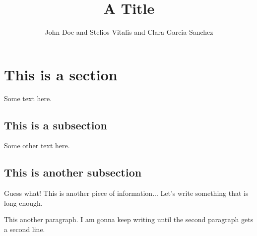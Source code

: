 \documentclass{article}
\title{A Title}
\author{John Doe and Stelios Vitalis and Clara Garcia-Sanchez}
\begin{document}
\maketitle

\section{This is a section}

Some text here.

\subsection{This is a subsection}

Some other text here.

\subsection{This is another subsection}

Guess what!
This is another piece of information...
Let's write something that is long enough.

This another paragraph.
I am gonna keep writing until the second paragraph gets a second line.
\end{document}
